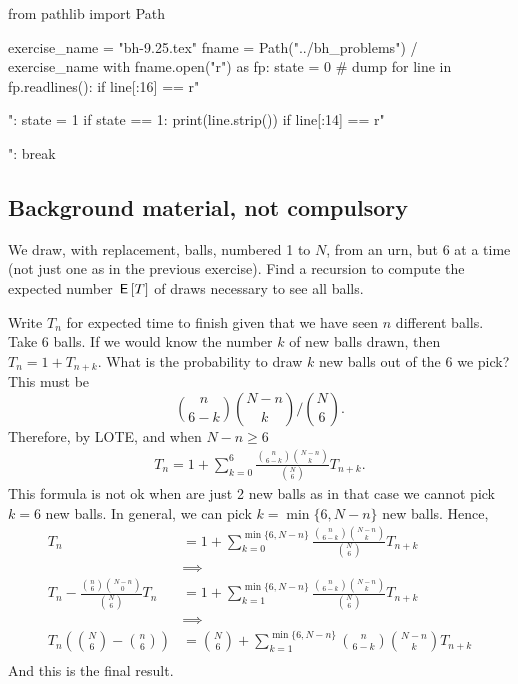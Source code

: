\begin{pycode}
from pathlib import Path

exercise_name = "bh-9.25.tex"
fname = Path("../bh_problems") / exercise_name
with fname.open("r") as fp:
    state = 0  # dump
    for line in fp.readlines():
        if line[:16] == r"\begin{exercise}":
            state = 1
        if state == 1:
            print(line.strip())
        if line[:14] == r"\end{exercise}":
            break
\end{pycode}

\subsection{Background material, not compulsory}
\label{sec:backgr-mater-not}

\begin{exercise}
We draw, with replacement, balls, numbered 1 to $N$, from an urn, but 6 at a time (not just one as in the previous exercise).
Find a recursion to compute the expected number $\,\mathsf{E}\left[T\right]$ of draws necessary to see all balls.
\begin{solution}
  Write $T_{n}$ for expected time to finish given that we have seen $n$ different balls.
  Take 6 balls.
  If we would know the number $k$ of new balls drawn, then $T_{n} = 1 + T_{n+k}$.
  What is the probability to draw $k$ new balls  out of the 6 we pick?
  This must be
\begin{equation}
\label{eq:930}
{n \choose 6-k}{N-n \choose k}\big/{N \choose 6}.
\end{equation}
Therefore, by LOTE, and when $N-n\geq 6$
\begin{align}
T_{n} = 1 + \sum_{k=0}^{6} \frac{{n \choose 6-k}{N-n \choose k}}{{N \choose 6}} T_{n+k}.
\end{align}
This formula is not ok when are just 2 new balls as in that case we cannot pick $k=6$ new balls. In general, we can pick $k=\min\{6, N-n\}$ new balls. Hence,
\begin{align}
T_{n}
&=
1 + \sum_{k=0}^{\min\{6, N-n\}} \frac{{n \choose 6-k}{N-n \choose k}}{{N \choose 6}} T_{n+k} \\
&\implies \\
T_{n} - \frac{{n \choose 6}{N-n \choose 0}}{{N \choose 6}} T_{n}
&=1 + \sum_{k=1}^{\min\{6, N-n\}} \frac{{n \choose 6-k}{N-n \choose k}}{{N \choose 6}} T_{n+k} \\
&\implies \\
T_{n}\left( {N\choose 6}  -{n \choose 6} \right)
&={N\choose 6} + \sum_{k=1}^{\min\{6, N-n\}}{n \choose 6-k}{N-n \choose k} T_{n+k} \\
\end{align}
And this is the final result.

\end{solution}
\end{exercise}

